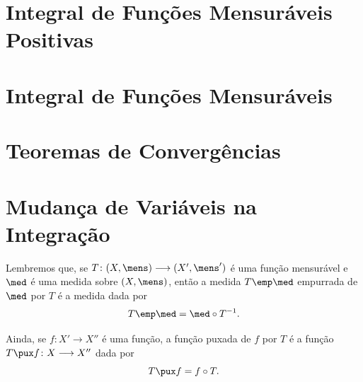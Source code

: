 \section{Integral de Funções Mensuráveis Positivas}

\section{Integral de Funções Mensuráveis}

\section{Teoremas de Convergências}

\section{Mudança de Variáveis na Integração}

Lembremos que, se $T\colon (X,\mens) \to (X',\mens')$ é uma função mensurável e $\med$ é uma medida sobre $(X,\mens)$, então a medida $T\emp \med$ empurrada de $\med$ por $T$ é a medida dada por
	\begin{equation*}
	T\emp \med = \med \circ T\inv.
	\end{equation*}

Ainda, se $f\colon X' \to X''$ é uma função, a função puxada de $f$ por $T$ é a função $T\pux f\colon X \to X''$ dada por
	\begin{equation*}
	T\pux f = f \circ T.
	\end{equation*}

